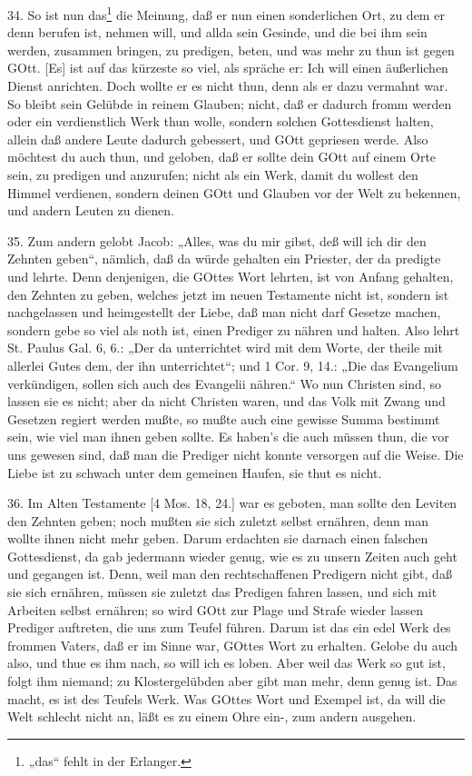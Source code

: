 34. So ist nun das\footnote{„das“ fehlt in der Erlanger.} die Meinung, daß er nun einen sonderlichen Ort, zu dem er denn berufen ist, nehmen will, und allda sein Gesinde, und die bei ihm sein werden, zusammen bringen, zu predigen, beten, und was mehr zu thun ist gegen GOtt. [Es] ist auf das kürzeste so viel,
als spräche er: Ich will einen äußerlichen Dienst anrichten. Doch wollte er es nicht thun, denn als er dazu vermahnt war. So bleibt sein Gelübde in reinem Glauben; nicht, daß er dadurch fromm werden oder ein verdienstlich Werk thun wolle, sondern solchen Gottesdienst halten, allein daß andere Leute dadurch gebessert, und GOtt gepriesen werde. Also möchtest du auch thun, und geloben, daß er sollte dein GOtt auf einem Orte sein, zu predigen und anzurufen; nicht als ein Werk, damit du wollest den Himmel verdienen, sondern deinen GOtt und Glauben vor der Welt zu bekennen, und andern Leuten zu dienen.

35. Zum andern gelobt Jacob: „Alles, was du mir gibst, deß will ich dir den Zehnten geben“, nämlich, daß da würde gehalten ein Priester, der da predigte und lehrte. Denn denjenigen, die GOttes Wort lehrten, ist von Anfang gehalten, den Zehnten zu geben, welches jetzt im neuen Testamente nicht ist, sondern ist nachgelassen und heimgestellt der Liebe, daß man nicht darf Gesetze machen, sondern gebe so viel als noth ist, einen Prediger zu nähren und halten. Also lehrt St. Paulus Gal. 6, 6.: „Der da unterrichtet wird mit dem Worte, der theile mit allerlei Gutes dem, der ihn unterrichtet“; und 1 Cor. 9, 14.: „Die das Evangelium verkündigen, sollen sich auch des Evangelii nähren.“ Wo nun Christen sind, so lassen sie es nicht; aber da nicht Christen waren, und das Volk mit Zwang und Gesetzen regiert werden mußte, so mußte auch eine gewisse Summa bestimmt sein, wie viel man ihnen geben sollte. Es haben’s die auch müssen thun, die vor uns gewesen sind, daß man die Prediger nicht konnte versorgen auf die Weise. Die Liebe ist zu schwach unter dem gemeinen Haufen, sie thut es nicht.

36. Im Alten Testamente [4 Mos. 18, 24.] war es geboten, man sollte den Leviten den Zehnten geben; noch mußten sie sich zuletzt selbst ernähren, denn man wollte ihnen nicht mehr geben. Darum erdachten sie darnach einen falschen Gottesdienst, da gab jedermann wieder genug, wie es zu unsern Zeiten auch geht und gegangen ist. Denn, weil man den rechtschaffenen Predigern nicht gibt, daß sie sich ernähren, müssen sie zuletzt das Predigen fahren lassen, und sich mit Arbeiten selbst ernähren; so wird GOtt zur Plage und Strafe wieder lassen Prediger auftreten, die uns zum Teufel führen. Darum ist das ein edel Werk des frommen Vaters, daß er im Sinne war, GOttes Wort zu erhalten. Gelobe du auch also, und thue es ihm nach, so will ich es loben. Aber weil das Werk so gut ist, folgt ihm niemand; zu Klostergelübden aber gibt man mehr, denn genug ist. Das macht, es ist des Teufels Werk. Was GOttes Wort und Exempel ist, da will die Welt schlecht nicht an, läßt es zu einem Ohre ein-, zum andern ausgehen.

